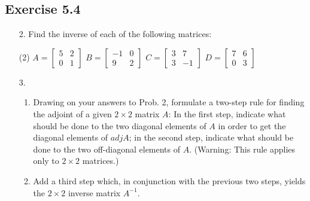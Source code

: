 \documentclass{./../../Latex/homework}
\begin{document}
\subsection*{Exercise 5.4}

\begin{enumerate}

\item[2.] Find the inverse of each of the following matrices:
\begin{tasks}(2)
\task $A=\left[\begin{array}{ll}5 & 2 \\ 0 & 1\end{array}\right]$
\task $B=\left[\begin{array}{rr}-1 & 0 \\ 9 & 2\end{array}\right]$
\task $C=\left[\begin{array}{rr}3 & 7 \\ 3 & -1\end{array}\right]$
\task $D=\left[\begin{array}{ll}7 & 6 \\ 0 & 3\end{array}\right]$ 
\end{tasks} 

\item[3.] 
\begin{enumerate}
\item Drawing on your answers to Prob. 2, formulate a two-step rule for finding the adjoint of a given $2 \times 2$ matrix $A$: In the first step, indicate what should be done to the two diagonal elements of $A$ in order to get the diagonal elements of $adjA$; in the second step, indicate what should be done to the two off-diagonal elements of $A$. (Warning: This rule applies only to $2 \times 2$ matrices.) 
\item Add a third step which, in conjunction with the previous two steps, yields the $2 \times 2$ inverse matrix $A^{-1}$.
\end{enumerate}


\end{enumerate}
\end{document}
